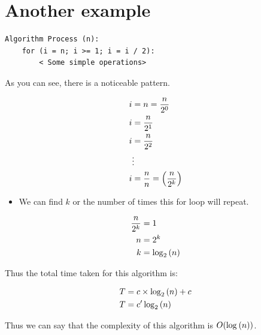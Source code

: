 \section{Another example}
\begin{lstlisting}
Algorithm Process (n):
    for (i = n; i >= 1; i = i / 2): 
        < Some simple operations> 
\end{lstlisting}
As you can see, there is a noticeable pattern. 
\begin{center}
   \begin{align*}
       i &= n = \frac{n}{2^0} \\ 
       i &= \frac{n}{2^1} \\ 
       i &= \frac{n}{2^2} \\ 
       &\vdots \\ 
       i &= \frac{n}{n} =  \left(\frac{n}{2^k}\right)  \\  
   \end{align*}
   \begin{itemize}
       \item We can find $k$ or the number of times this for loop will repeat.
   \end{itemize}
   \begin{align*}
       \frac{n}{2^k} &= 1 \\ 
       n &= 2^k \\ 
       k &= \log_{2} \left( n \right)  \\ 
   \end{align*}
\end{center}
Thus the total time taken for this algorithm is: 
\begin{center}
   \begin{align*}
       T &= c \times \log_{2} \left( n \right)  + c \\ 
       T &= c' \log_{2} \left( n \right)  \\ 
   \end{align*}
\end{center}
Thus we can say that the complexity of this algorithm is $O(\log_{} \left( n \right) )$.

